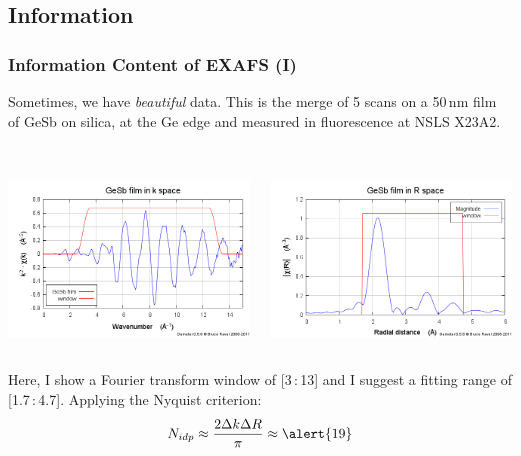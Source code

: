 \documentclass[10pt, xcolor=x11names, compress]{beamer}
\begin{document}
\subsection[Information]{Information}
\begin{frame}
  \frametitle{Information Content of EXAFS (I)} 

  \small
  Sometimes, we have {\color{Green4}\textit{beautiful}} data.  This is
  the merge of 5 scans on a 50\,nm film of GeSb on silica, at the Ge
  edge and measured in fluorescence at NSLS X23A2.\\~

  \begin{columns}
    \begin{column}{0.5\linewidth}
      \begin{center}
        \includegraphics[width=0.8\linewidth]{info/gesb_chik.png}
      \end{center}
    \end{column}
    \begin{column}{0.5\linewidth}
      \begin{center}
        \includegraphics[width=0.8\linewidth]{info/gesb_chir.png}
      \end{center}
    \end{column}
  \end{columns}
  Here, I show a Fourier transform window of [3\,:\,13] and I suggest a
  fitting range of [1.7\,:\,4.7].  Applying the Nyquist criterion:
  \begin{equation}
    \notag N_{idp} \approx \frac{2\Delta k\Delta R}{\pi} \approx \alert{19}
  \end{equation}


\end{frame}
\end{document}
